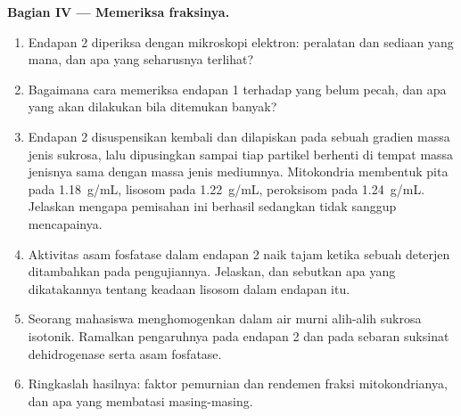 \begin{problem}
\medskip
\noindent\textbf{Bagian IV --- Memeriksa fraksinya.}
\begin{enumerate}[resume]
  \item Endapan 2 diperiksa dengan mikroskopi elektron: peralatan dan
        sediaan yang mana, dan apa yang seharusnya terlihat?
  \item Bagaimana cara memeriksa endapan 1 terhadap  yang belum
        pecah, dan apa yang akan dilakukan bila ditemukan banyak?
  \item Endapan 2 disuspensikan kembali dan dilapiskan pada sebuah
        gradien massa jenis sukrosa, lalu dipusingkan sampai tiap
        partikel berhenti di tempat massa jenisnya sama dengan massa
        jenis mediumnya. Mitokondria membentuk pita pada
        \qty{1.18}{g/mL}, lisosom pada \qty{1.22}{g/mL}, peroksisom
        pada \qty{1.24}{g/mL}. Jelaskan mengapa pemisahan ini berhasil
        sedangkan  tidak sanggup mencapainya.
  \item Aktivitas asam fosfatase dalam endapan 2 naik tajam ketika
        sebuah deterjen ditambahkan pada pengujiannya. Jelaskan, dan
        sebutkan apa yang dikatakannya tentang keadaan lisosom dalam
        endapan itu.
  \item Seorang mahasiswa menghomogenkan dalam air murni alih-alih
        sukrosa isotonik. Ramalkan pengaruhnya pada endapan 2 dan pada
        sebaran suksinat dehidrogenase serta asam fosfatase.
  \item Ringkaslah hasilnya: faktor pemurnian dan rendemen fraksi
        mitokondrianya, dan apa yang membatasi masing-masing.
\end{enumerate}
\end{problem}
